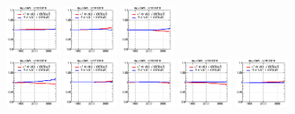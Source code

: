 \begin{figure}[!htbp]
{{\includegraphics[width=0.16\textwidth]{fig/spectra__pdf33_BB18_ADDGRW.png}
\includegraphics[width=0.16\textwidth]{fig/spectra__pdf34_BB18_ADDGRW.png}
\includegraphics[width=0.16\textwidth]{fig/spectra__pdf35_BB18_ADDGRW.png}\\
\includegraphics[width=0.16\textwidth]{fig/spectra__pdf36_BB18_ADDGRW.png}
\includegraphics[width=0.16\textwidth]{fig/spectra__pdf37_BB18_ADDGRW.png}
\includegraphics[width=0.16\textwidth]{fig/spectra__pdf38_BB18_ADDGRW.png}
\includegraphics[width=0.16\textwidth]{fig/spectra__pdf39_BB18_ADDGRW.png}
\includegraphics[width=0.16\textwidth]{fig/spectra__pdf40_BB18_ADDGRW.png}\\
}}
\end{figure}
